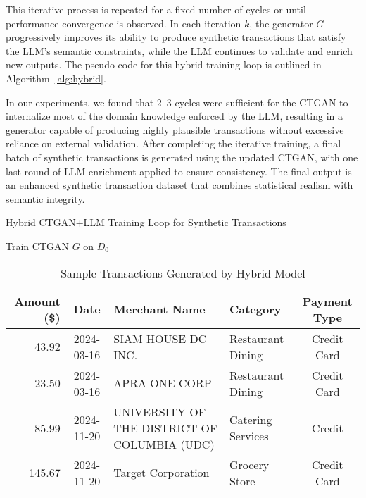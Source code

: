 \documentclass[conference]{IEEEtran}
\begin{document}
This iterative process is repeated for a fixed number of cycles or until performance convergence is observed. In each iteration \( k \), the generator \( G \) progressively improves its ability to produce synthetic transactions that satisfy the LLM's semantic constraints, while the LLM continues to validate and enrich new outputs. The pseudo-code for this hybrid training loop is outlined in Algorithm~\ref{alg:hybrid}. 

In our experiments, we found that 2--3 cycles were sufficient for the CTGAN to internalize most of the domain knowledge enforced by the LLM, resulting in a generator capable of producing highly plausible transactions without excessive reliance on external validation. After completing the iterative training, a final batch of synthetic transactions is generated using the updated CTGAN, with one last round of LLM enrichment applied to ensure consistency. The final output is an enhanced synthetic transaction dataset that combines statistical realism with semantic integrity.



\begin{algorithm}[t]
\caption{Hybrid CTGAN+LLM Training Loop for Synthetic Transactions}
\label{alg:hybrid}
\small
\SetAlgoLined
{}
Train CTGAN $G$ on $D_0$\;
\end{algorithm}


\begin{table*}[htbp]
\centering
\small
\renewcommand{\arraystretch}{1.3}
\caption{Sample Transactions Generated by Hybrid Model}
\label{tab:hybrid_transactions}
\begin{tabular}{|r|c|l|l|c|}
\hline
\textbf{Amount (\$)} & \textbf{Date} & \textbf{Merchant Name} & \textbf{Category} & \textbf{Payment Type} \\
\hline
43.92  & 2024-03-16 & SIAM HOUSE DC INC. & Restaurant Dining & Credit Card \\
\hline
23.50  & 2024-03-16 & APRA ONE CORP & Restaurant Dining & Credit Card \\
\hline
85.99  & 2024-11-20 & UNIVERSITY OF THE DISTRICT OF COLUMBIA (UDC) & Catering Services & Credit \\
\hline
145.67 & 2024-11-20 & Target Corporation & Grocery Store & Credit Card \\
\hline
\end{tabular}
\end{table*}
\end{document}

